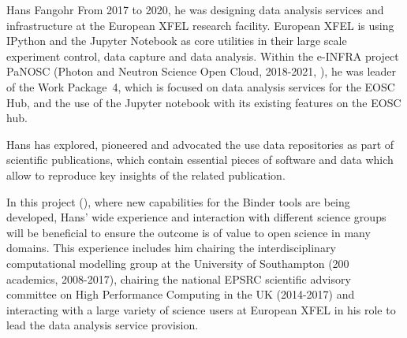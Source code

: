 \begin{participant}[type=leadPI,PM=5,gender=male]{Hans Fangohr}
  From 2017 to 2020, he was designing data analysis services and
  infrastructure at the European XFEL research facility. European XFEL
  is using IPython and the Jupyter Notebook as core utilities in their
  large scale experiment control, data capture and data
  analysis. Within the e-INFRA project PaNOSC (Photon and Neutron
  Science Open Cloud, 2018-2021, \cite{panosc}), he was leader of the
  Work Package~4, which is focused on data analysis services for the
  EOSC Hub, and the use of the Jupyter notebook with its existing
  features on the EOSC hub.

  Hans has explored, pioneered and advocated the use data repositories as part
  of scientific publications, which contain essential pieces of software and
  data which allow to reproduce key insights of the related publication.

  In this project (\TheProject), where new capabilities for the Binder tools
  are being developed, Hans' wide experience and
  interaction with different science groups will be beneficial to
  ensure the outcome is of value to open science in many domains. This
  experience includes him chairing the interdisciplinary computational modelling
  group at the University of Southampton (200 academics, 2008-2017),
  chairing the national EPSRC scientific advisory committee on High
  Performance Computing in the UK (2014-2017) and interacting with a
  large variety of science users at European XFEL in his role
  to lead the data analysis service provision.
\end{participant}

